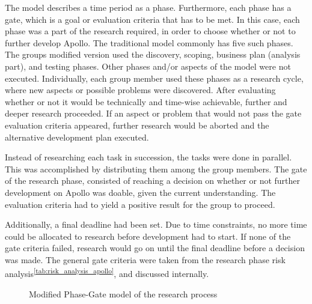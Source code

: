 The model describes a time period as a phase. Furthermore, each phase has a gate, which is a goal or evaluation criteria that has to be met. In this case, each phase was a part of the research required, in order to choose whether or not to further develop Apollo. The traditional model commonly has five such phases. The groups modified version used the discovery, scoping, business plan (analysis part), and testing phases. Other phases and/or aspects of the model were not executed. Individually, each group member used these phases as a research cycle, where new aspects or possible problems were discovered. After evaluating whether or not it would be technically and time-wise achievable, further and deeper research proceeded. If an aspect or problem that would not pass the gate evaluation criteria appeared, further research would be aborted and the alternative development plan executed.

Instead of researching each task in succession, the tasks were done in parallel. This was accomplished by distributing them among the group members. The gate of the research phase, consisted of reaching a decision on whether or not further development on Apollo was doable, given the current understanding. The evaluation criteria had to yield a positive result for the group to proceed.

Additionally, a final deadline had been set. Due to time constraints, no more time could be allocated to research before development had to start. If none of the gate criteria failed, research would go on until the final deadline before a decision was made. The general gate criteria were taken from the research phase risk analysis\textsuperscript{\ref{tab:risk_analysis_apollo}}, and discussed internally.

\begin{center}
  \begin{figure}[ht!]
    \caption{Modified Phase-Gate model of the research process}
    \label{fig:phasegate}
  \end{figure}
\end{center}

